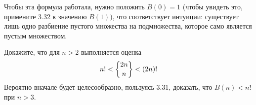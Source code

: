 Чтобы эта формула работала, нужно положить $B(0) = 1$ (чтобы увидеть это, примените 3.32 к значению $B(1)$), что соответствует интуиции: существует лишь одно разбиение пустого множества на подмножества, которое само является пустым множеством.

\begin{exercise}
Докажите, что для $n>2$ выполняется оценка
$$n! < \sstirling{2n}{n} < (2n)!$$
Вероятно вначале будет целесообразно, пользуясь 3.31, доказать, что $B(n) < n!$ при $n>3$.
\end{exercise}